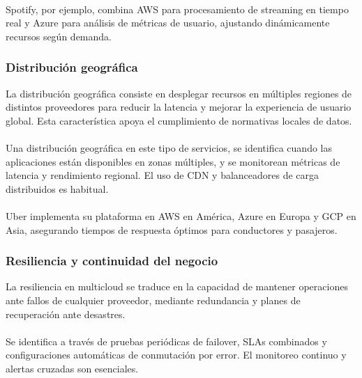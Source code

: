 {                \paragraph{}Spotify, por ejemplo, combina AWS para procesamiento de streaming en tiempo real y Azure para análisis de métricas de usuario, ajustando dinámicamente recursos según demanda.
            
            \subsubsection{Distribución geográfica}
                La distribución geográfica consiste en desplegar recursos en múltiples regiones de distintos proveedores para reducir la latencia y mejorar la experiencia de usuario global. Esta característica apoya el cumplimiento de normativas locales de datos.
                
                \paragraph{}Una distribución geográfica en este tipo de servicios, se identifica cuando las aplicaciones están disponibles en zonas múltiples, y se monitorean métricas de latencia y rendimiento regional. El uso de CDN y balanceadores de carga distribuidos es habitual.

                \paragraph{}Uber implementa su plataforma en AWS en América, Azure en Europa y GCP en Asia, asegurando tiempos de respuesta óptimos para conductores y pasajeros.
            
            \subsubsection{Resiliencia y continuidad del negocio}
                La resiliencia en multicloud se traduce en la capacidad de mantener operaciones ante fallos de cualquier proveedor, mediante redundancia y planes de recuperación ante desastres.
                
                \paragraph{}Se identifica a través de pruebas periódicas de failover, SLAs combinados y configuraciones automáticas de conmutación por error. El monitoreo continuo y alertas cruzadas son esenciales.
            
}
